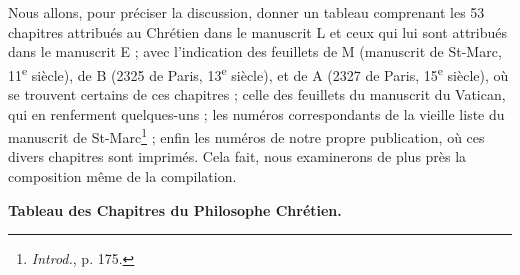 \documentclass[a4paper, 11pt, oneside, polutonikogreek, french]{article}
\begin{document}
Nous allons, pour préciser la discussion, donner un tableau comprenant les 53 chapitres attribués au Chrétien dans le manuscrit L et ceux qui lui sont attribués dans le manuscrit E ; avec l'indication des feuillets de M (manuscrit de St-Marc, 11\textsuperscript{e} siècle), de B (2325 de Paris, 13\textsuperscript{e} siècle), et de A (2327 de Paris, 15\textsuperscript{e} siècle), où se trouvent certains de ces chapitres ; celle des feuillets du manuscrit du Vatican, qui en renferment quelques-uns ; les numéros correspondants de la vieille liste du manuscrit de St-Marc\footnote{\emph{Introd.}, p. 175.} ; enfin les numéros de notre propre publication, où ces divers chapitres sont imprimés. Cela fait, nous examinerons de plus près la composition même de la compilation.
\begin{center}
\textbf{Tableau des Chapitres du Philosophe Chrétien.}
\end{center}
\end{document}
